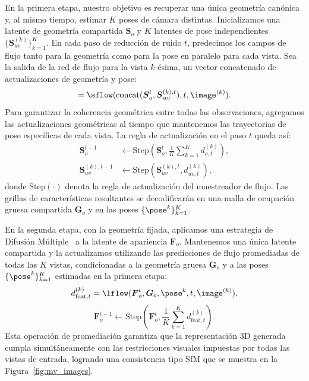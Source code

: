 \documentclass[../../book-main_es.tex]{subfiles}
\begin{document}
En la primera etapa, nuestro objetivo es recuperar una única geometría canónica y, al mismo 
tiempo, estimar $K$ poses de cámara distintas. Inicializamos una latente de geometría 
compartida $\boldsymbol{S}_{o}$ y $K$ latentes de pose independientes 
$\{ \boldsymbol{S}_{uv}^{(k)} \}_{k=1}^K$. En cada paso de reducción de ruido $t$, 
predecimos los campos de flujo tanto para la geometría como para la pose en paralelo para 
cada vista. Sea la salida de la red de flujo para la vista $k$-ésima, un vector concatenado 
de actualizaciones de geometría y pose:
\begin{equation}
    [d_{o, t}^{(k)}, d_{uv, t}^{(k)}] = \sflow(\text{concat}(\boldsymbol{S}_{o}^t, \boldsymbol{S}_{uv}^{(k), t}), t, \image^{(k)}).
\end{equation}
Para garantizar la coherencia geométrica entre todas las observaciones, agregamos las 
actualizaciones geométricas al tiempo que mantenemos las trayectorias de pose específicas de 
cada vista. La regla de actualización en el paso $t$ queda así:
\begin{align}
    \boldsymbol{S}_{o}^{t-1} &\leftarrow \text{Step}\left(\boldsymbol{S}_{o}^{t}, \frac{1}{K} \sum_{k=1}^K d_{o, t}^{(k)}\right), \\
    \boldsymbol{S}_{uv}^{(k), t-1} &\leftarrow \text{Step}\left(\boldsymbol{S}_{uv}^{(k), t}, d_{uv, t}^{(k)}\right),
\end{align}
donde $\text{Step}(\cdot)$ denota la regla de actualización del muestreador de flujo. Las grillas 
de características resultantes se decodificarán en una malla de ocupación gruesa compartida 
$\boldsymbol{G}_o$ y en las poses $\{\pose^{k}\}_{k=1}^{K}$.

En la segunda etapa, con la geometría fijada, aplicamos una estrategia de Difusión 
Múltiple~\citep{bar2023multidiffusion} a la latente de apariencia $\boldsymbol{F}_{o}$. 
Mantenemos una única latente compartida y la actualizamos utilizando las predicciones de 
flujo promediadas de todas las $K$ vistas, condicionadas a la geometría gruesa 
$\boldsymbol{G}_o$ y a las poses $\{\pose^{k}\}_{k=1}^{K}$ estimadas en la primera etapa:
\begin{equation}
    d_{\text{feat}, t}^{(k)} = \lflow(\boldsymbol{F}_{o}^t, \boldsymbol{G}_o, \pose^{k}, t, \image^{(k)}),
\end{equation}
\begin{equation}
    \boldsymbol{F}_{o}^{t-1} \leftarrow \text{Step}\left(\boldsymbol{F}_{o}^{t}, \frac{1}{K} \sum_{k=1}^K d_{\text{feat}, t}^{(k)}\right).
\end{equation}
Esta operación de promediación garantiza que la representación 3D generada cumpla simultáneamente 
con las restricciones visuales impuestas por todas las vistas de entrada, logrando una consistencia 
tipo SfM que se muestra en la Figura~\ref{fig:mv_images}.
\end{document}
